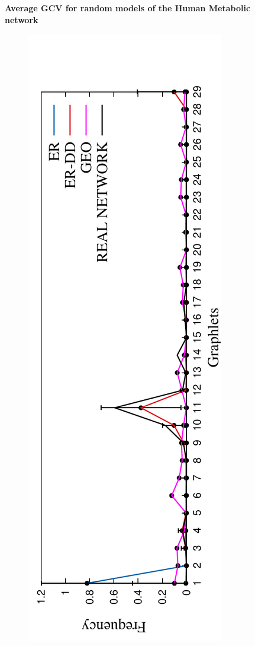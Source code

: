 \begin{figure}[H]
  \centering
  \textbf{Average GCV for random models of the Human Metabolic network}
  \begin{subfigure}[b]{1.0\textwidth}
    \includegraphics[angle=-90,scale=0.6]{../code/final_results/hsa_metabolic_network/avg_egdvs_rnd_spreads_figures/spreads_012_rnd2.pdf} 

\end{subfigure}
\end{figure}

